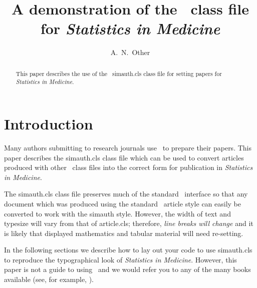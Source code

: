 \documentclass[times]{simauth}
\begin{document}

\title{A demonstration of the \LaTeXe\ class file for
\itshape{Statistics in Medicine}\footnotemark[2]}

\author{A.~N.~Other\corrauth}

\address{John Wiley \& Sons, Ltd, The Atrium, Southern Gate, Chichester,
West Sussex, PO19~8SQ, UK}


\begin{abstract}
This paper describes the use of the \LaTeXe\ \textsf{simauth.cls}
class file for setting papers for \emph{Statistics in Medicine}.
\end{abstract}


\maketitle


\section{Introduction}
Many authors submitting to research journals use \LaTeXe\ to
prepare their papers. This paper describes the
\textsf{simauth.cls} class file which can be used to convert
articles produced with other \LaTeXe\ class files into the correct
form for publication in \emph{Statistics in Medicine}.

The \textsf{simauth.cls} class file preserves much of the standard
\LaTeXe\ interface so that any document which was produced using
the standard \LaTeXe\ \textsf{article} style can easily be
converted to work with the \textsf{simauth} style. However, the
width of text and typesize will vary from that of
\textsf{article.cls}; therefore, \emph{line breaks will change}
and it is likely that displayed mathematics and tabular material
will need re-setting.

In the following sections we describe how to lay out your code to
use \textsf{simauth.cls} to reproduce the typographical look of
\emph{Statistics in Medicine}. However, this paper is not a guide
to using \LaTeXe\ and we would refer you to any of the many books
available (see, for example, \cite{R1,R2,R3}).
\end{document}
